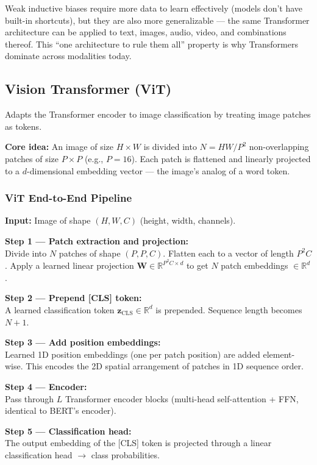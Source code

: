 \documentclass[11pt, a4paper]{article}
\begin{document}
\begin{notebox}
Weak inductive biases require more data to learn effectively (models don't have built-in shortcuts), but they are also more generalizable --- the same Transformer architecture can be applied to text, images, audio, video, and combinations thereof. This ``one architecture to rule them all'' property is why Transformers dominate across modalities today.
\end{notebox}

\subsection{Vision Transformer (ViT)}

\begin{defbox}
Adapts the Transformer encoder to image classification by treating image patches as tokens.

\textbf{Core idea:} An image of size $H \times W$ is divided into $N = HW/P^2$ non-overlapping patches of size $P \times P$ (e.g., $P = 16$). Each patch is flattened and linearly projected to a $d$-dimensional embedding vector --- the image's analog of a word token.
\end{defbox}

\subsubsection{ViT End-to-End Pipeline}

\begin{exbox}
\textbf{Input:} Image of shape $(H, W, C)$ (height, width, channels).

\textbf{Step 1 --- Patch extraction and projection:}\\
Divide into $N$ patches of shape $(P, P, C)$. Flatten each to a vector of length $P^2 C$. Apply a learned linear projection $\mathbf{W} \in \mathbb{R}^{P^2C \times d}$ to get $N$ patch embeddings $\in \mathbb{R}^d$.

\textbf{Step 2 --- Prepend [CLS] token:}\\
A learned classification token $\mathbf{z}_{\text{CLS}} \in \mathbb{R}^d$ is prepended. Sequence length becomes $N+1$.

\textbf{Step 3 --- Add position embeddings:}\\
Learned 1D position embeddings (one per patch position) are added element-wise. This encodes the 2D spatial arrangement of patches in 1D sequence order.

\textbf{Step 4 --- Encoder:}\\
Pass through $L$ Transformer encoder blocks (multi-head self-attention + FFN, identical to BERT's encoder).

\textbf{Step 5 --- Classification head:}\\
The output embedding of the [CLS] token is projected through a linear classification head $\to$ class probabilities.
\end{exbox}
\end{document}
